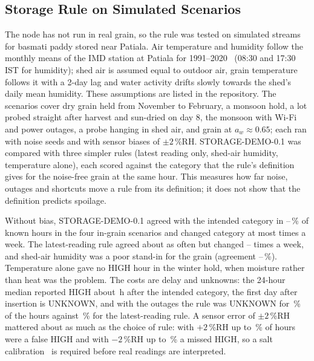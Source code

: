 \subsection{Storage Rule on Simulated Scenarios}
\label{sec:results-storage}

The node has not run in real grain, so the rule was tested on simulated streams for basmati paddy stored near Patiala.
Air temperature and humidity follow the monthly means of the IMD station at Patiala for 1991--2020~\cite{imd2022} (08:30 and
17:30 IST for humidity); shed air is assumed equal to outdoor air, grain temperature follows it with a 2-day lag and water
activity drifts slowly towards the shed's daily mean humidity. These assumptions are listed in the repository. The
 scenarios cover dry grain held from November to February, a monsoon hold, a lot probed straight after
harvest and sun-dried on day 8, the monsoon with Wi-Fi and power outages, a probe hanging in shed air, and grain at
$a_w\approx0.65$; each ran with  noise seeds and with sensor biases of $\pm2$\,\%RH. STORAGE-DEMO-0.1 was compared
with three simpler rules (latest reading only, shed-air humidity, temperature alone), each scored against the category that the
rule's definition gives for the noise-free grain at the same hour. This measures how far noise, outages and shortcuts move a
rule from its definition; it does not show that the definition predicts spoilage.

Without bias, STORAGE-DEMO-0.1 agreed with the intended category in --\,\% of known
hours in the four in-grain scenarios and changed category at most  times a week. The latest-reading rule
agreed about as often but changed -- times a week, and shed-air humidity was a poor
stand-in for the grain (agreement --\,\%). Temperature alone gave no HIGH hour in the winter
hold, when moisture rather than heat was the problem. The costs are delay and unknowns: the 24-hour median reported HIGH about
\,h after the intended category, the first day after insertion is UNKNOWN, and with the outages the
rule was UNKNOWN for \,\% of the hours against \,\% for the latest-reading
rule. A sensor error of $\pm2$\,\%RH mattered about as much as the choice of rule: with $+2$\,\%RH up to
\,\% of hours were a false HIGH and with $-2$\,\%RH up to \,\%
a missed HIGH, so a salt calibration~\cite{greenspan1977} is required before real readings are interpreted.

